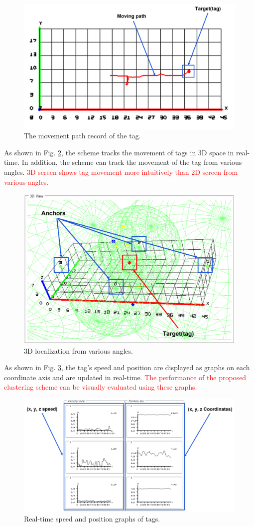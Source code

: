 \documentclass[conference]{IEEEtran}
\begin{document}
\begin{figure}[htbp]
    \centerline{\includegraphics[width=0.62\columnwidth]{fig7.png}}
    \caption{The movement path record of the tag.}
    \label{fig7}
\end{figure}

As shown in Fig. \ref{fig8}, the scheme tracks the movement of tags in 3D space in real-time. In addition, the scheme can track the movement of the tag from various angles. \textcolor{red}{3D screen shows tag movement more intuitively than 2D screen from various angles.}

\begin{figure}[htbp]
    \centerline{\includegraphics[width=0.62\columnwidth]{fig8.png}}
    \caption{3D localization from various angles.}
    \label{fig8}
\end{figure}

As shown in Fig. \ref{fig9}, the tag's speed and position are displayed as graphs on each coordinate axis and are updated in real-time. \textcolor{red}{The performance of the proposed clustering scheme can be visually evaluated using these graphs.}

\begin{figure}[htbp]
    \centerline{\includegraphics[width=0.62\columnwidth]{fig9.png}}
    \caption{Real-time speed and position graphs of tags.}
    \label{fig9}
\end{figure}
\end{document}
